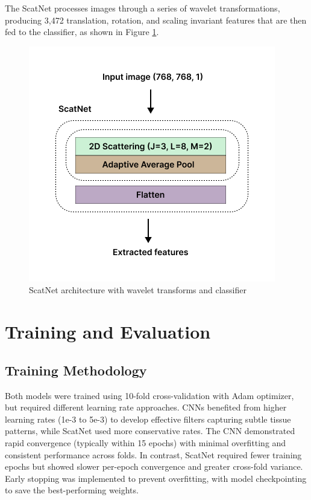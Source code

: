 \documentclass[10pt,twocolumn]{article}
\begin{document}
The ScatNet processes images through a series of wavelet transformations, producing 3,472 translation, rotation, and scaling invariant features that are then fed to the classifier, as shown in Figure \ref{fig:scatnet_arch}.

\begin{figure}[h]
\centering
\includegraphics[width=0.9\columnwidth]{imgs/scatnet_arch.png}
\caption{ScatNet architecture with wavelet transforms and classifier}
\label{fig:scatnet_arch}
\end{figure}


\section{Training and Evaluation}
\subsection{Training Methodology}
Both models were trained using 10-fold cross-validation with Adam optimizer, but required different learning rate approaches. CNNs benefited from higher learning rates (1e-3 to 5e-3) to develop effective filters capturing subtle tissue patterns, while ScatNet used more conservative rates. The CNN demonstrated rapid convergence (typically within 15 epochs) with minimal overfitting and consistent performance across folds. In contrast, ScatNet required fewer training epochs but showed slower per-epoch convergence and greater cross-fold variance. Early stopping was implemented to prevent overfitting, with model checkpointing to save the best-performing weights.
\end{document}

